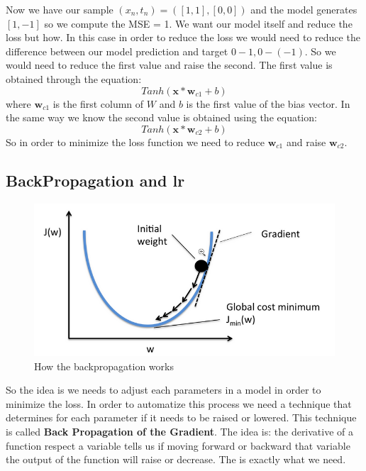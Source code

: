 Now we have our sample $(x_n, t_n) = ([1,1], [0,0])$ and the model generates $[1,-1]$ so we compute the MSE = 1. We want our model itself and reduce the loss but how. In this case in order to reduce the loss we would need to reduce the difference between our model prediction and target $0 - 1, 0 - (-1)$. So we would need to reduce the first value and raise the second. The first value is obtained through the equation:
\begin{equation}
Tanh(\textbf{x}*\textbf{w}_{c1} + b)
\end{equation}
where $\textbf{w}_{c1}$ is the first column of $W$ and $b$ is the first value of the bias vector.
In the same way we know the second value is obtained using the equation:
\begin{equation}
Tanh(\textbf{x}*\textbf{w}_{c2} + b)
\end{equation}
So in order to minimize the loss function we need to reduce $\textbf{w}_{c1}$ and raise $\textbf{w}_{c2}$.

\subsection{BackPropagation and lr}

\begin{figure}
    \centering
    \includegraphics[scale=0.65]{img/gradient.png}
    \caption{How the backpropagation works}
    \label{img:gradient}
\end{figure}

So the idea is we needs to adjust each parameters in a model in order to minimize the loss. In order to automatize this process we need a technique that determines for each parameter if it needs to be raised or lowered. This technique is called \textbf{Back Propagation of the Gradient}. The idea is: the derivative of a function respect a variable tells us if moving forward or backward that variable the output of the function will raise or decrease.  The is exactly what we need. 

